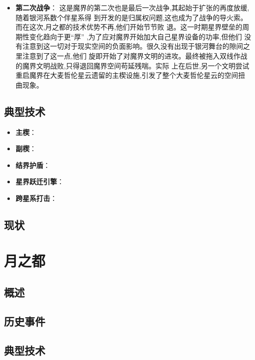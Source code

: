 \documentclass[10.5pt,compsoc,UTF8]{CjC}
\theoremstyle{mystyle}
\begin{document}
{\begin{itemize}
	一时期也被秘密开发了出来,魔界秘密在一些地点部署了自己的隐身自动化打击舰队来作为威慑,而这一
	手段也在魔界消失很久之后被证明有效。这一时期魔界与月之都先后开发出了跨星系航行结束,因此边境
	冲突随着新一轮扩张再次放缓了。
	\item \textbf{第二次战争}： 这是魔界的第二次也是最后一次战争,其起始于扩张的再度放缓,随着银河系数个伴星系得
	到开发的是归属权问题,这也成为了战争的导火索。而在这次,月之都的技术优势不再,他们开始节节败
	退。这一时期星界壁垒的周期性变化趋向于更“厚”
	,为了应对魔界开始加大自己星界设备的功率,但他们
	没有注意到这一切对于现实空间的负面影响。很久没有出现于银河舞台的隙间之里注意到了这一点,他们
	旋即开始了对魔界文明的进攻。最终被拖入双线作战的魔界文明战败,只得退回魔界空间苟延残喘。实际
	上在后世,另一个文明尝试重启魔界在大麦哲伦星云遗留的主楔设施,引发了整个大麦哲伦星云的空间扭
	曲现象。
\end{itemize}

\subsection{\color{gray}典型技术}

\begin{itemize}
	\item \textbf{主楔}：
	\item \textbf{副楔}：
	\item \textbf{结界护盾}：
	\item \textbf{星界跃迁引擎}：
	\item \textbf{跨星系打击}：
\end{itemize}

\subsection{\color{gray}现状}

\section{月之都}

\subsection{\color{gray}概述}

\subsection{\color{gray}历史事件}

\subsection{\color{gray}典型技术}

}
\end{document}
